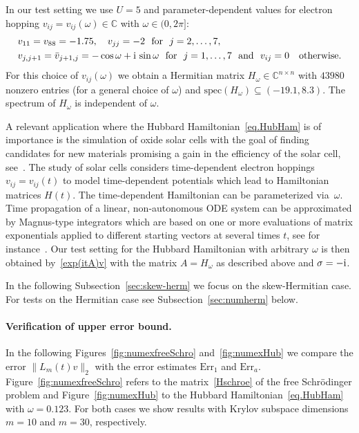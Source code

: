 \documentclass[smallextended]{svjour3pre}%
\numberwithin{equation}{section}
\numberwithin{figure}{section}
\numberwithin{table}{section}
\newcommand{\C}{\mathbb C}%
\newcommand\tjnew[1]{{#1}}
\newcommand{\ii}{{\rm i}}
\newcommand\Era{\mathrm{Err}_a}
\newcommand\Erone{\mathrm{Err}_1}
\newcommand\sca{\sigma}
\begin{document}
In our test setting we use $U=5$ and parameter-dependent values for electron hopping $v_{ij}=v_{ij}(\omega)\in\C$ with $\omega\in(0,2\pi]$:
\begin{align*}
&v_{11}=v_{88}=-1.75,~~~v_{jj}=-2~~\text{for}~~j=2,\ldots,7,\\
&v_{j,j+1}=\bar{v}_{j+1,j}=-\cos\omega+\ii\,\sin\omega~~\text{for}~~j=1,\ldots,7~~\text{and}~~v_{ij}=0~~~\text{otherwise}.
\end{align*}
For this choice of $v_{ij}(\omega)$ we obtain \tjnew{a Hermitian} matrix $H_\omega\in\C^{n\times n}$
with $43980$ nonzero entries (for a general choice of $\omega$) and $\text{spec}(H_\omega)\subseteq (-19.1,8.3)$.
The spectrum of $H_\omega$ is independent of $\omega$.

A relevant application where the Hubbard Hamiltonian~\eqref{eq.HubHam} is of importance
is the simulation of oxide solar cells with the goal of finding candidates for
new materials promising a gain in the efficiency of the solar cell,
see~\cite{Held2007}.
The study of solar cells considers time-dependent electron hoppings $v_{ij}=v_{ij}(t)$
to model time-dependent potentials
which lead to Hamiltonian matrices $H(t)$.
\tjnew{The time-dependent Hamiltonian can be parameterized via~$\omega$.}
Time propagation of a linear, non-autonomous ODE system
can be approximated by Magnus-type integrators
which are based on one or more evaluations of matrix exponentials
applied to different starting vectors at several times $ t $, see \tjnew{for instance~\cite{blanesetal08b,blamoa05}}.
Our test setting for the Hubbard Hamiltonian with arbitrary $\omega$ is then obtained by~\eqref{exp(itA)v} with the matrix $A=H_\omega$ as described above and $\sca=-\ii$.

{In the following Subsection~\ref{sec:skew-herm} we focus on the skew-Hermitian case. For tests on the Hermitian case see Subsection~\ref{sec:numherm} below.}



\paragraph{Verification of upper \tjnew{error} bound.}
In the following Figures~\ref{fig:numexfreeSchro} and~\ref{fig:numexHub}
we compare the error $\|L_m(t)v\|_2$ with the error estimates
$\Erone$ and $\Era$. %
Figure~\ref{fig:numexfreeSchro} refers to
the matrix~\eqref{Hschroe} of the free Schr{\"o}dinger problem
and Figure~\ref{fig:numexHub}
to the Hubbard Hamiltonian~\eqref{eq.HubHam} with $\omega=0.123$.
For both cases we show results with Krylov subspace dimensions
$ m=10 $ and $ m=30 $, respectively.
\end{document}
